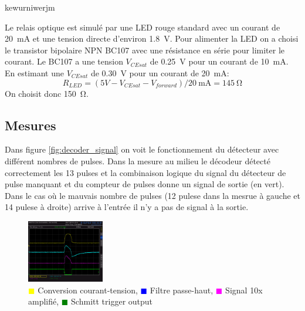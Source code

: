\documentclass[french]{layout/Report}
\begin{document}

\begin{description}[leftmargin=!,labelwidth=4cm, labelindent=\parindent]
	\item[Déclencheur] kewurniwerjm
	\item[Relais] Le relais optique est simulé par une LED rouge standard avec un courant de \SI{20}{\milli\ampere} et une tension directe d'environ \SI{1.8}{\volt}. Pour alimenter la LED on a choisi le transistor bipolaire NPN BC107 avec une résistance en série pour limiter le courant.
		Le BC107 a une tension \(V_{CEsat}\) de \SI{0.25}{\volt} pour un courant de \SI{10}{\milli\ampere}.
		En estimant une \(V_{CEsat}\) de \SI{0.30}{\volt} pour un courant de \SI{20}{\milli\ampere}:
\[
	R_{LED} = (5V - V_{CEsat} - V_{forward})/\SI{20}{\milli\ampere} = \SI{145}{\ohm}
\]
On choisit donc \SI{150}{\ohm}.


\end{description}
\subsection{Mesures}

Dans figure \ref{fig:decoder_signal} on voit le fonctionnement du détecteur avec différent nombres de pulses.
Dans la mesure au milieu le décodeur détecté correctement les 13 pulses et la combinaison logique
du signal du détecteur de pulse manquant et du compteur de pulses donne un signal de sortie (en vert).
Dans le cas où le mauvais nombre  de pulses (12 pulese dans la mesrue à gauche et 14 pulese à droite)
arrive à l'entrée il n'y a pas de signal à la sortie.

\begin{figure}[h]
\hspace{5mm}
\includegraphics[width=0.3\textwidth]{../measurements/SCR03}
\caption{
\textcolor{yellow}{$\blacksquare$} Conversion courant-tension,
\textcolor{blue}{$\blacksquare$} Filtre passe-haut,
\textcolor{magenta}{$\blacksquare$} Signal 10x amplifié,
\textcolor{green}{$\blacksquare$} Schmitt trigger output
}
\label{fig:filter_signal}
\end{figure}
\end{document}
